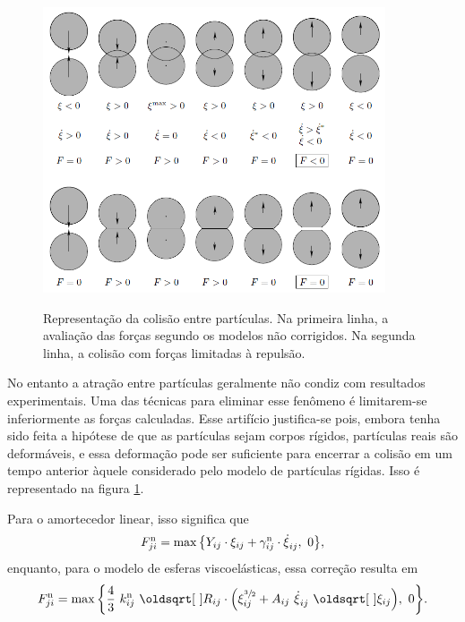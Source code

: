 \begin{figure}[h]
	\caption{Representação da colisão entre partículas. Na primeira linha, a avaliação das forças segundo os modelos não corrigidos. Na segunda linha, a colisão com forças limitadas à repulsão.}
	\centering
		\includegraphics[width=0.9\textwidth]{images/mathematical_model/particle_attraction.PNG}
	\label{fig:particle_attraction}
\end{figure}

No entanto a atração entre partículas geralmente não condiz com resultados experimentais. Uma das técnicas para eliminar esse fenômeno é limitarem-se inferiormente as forças calculadas. Esse artifício justifica-se pois, embora tenha sido feita a hipótese de que as partículas sejam corpos rígidos, partículas reais são deformáveis, e essa deformação pode ser suficiente para encerrar a colisão em um tempo anterior àquele considerado pelo modelo de partículas rígidas. Isso é representado na figura \ref{fig:particle_attraction}.

Para o amortecedor linear, isso significa que
\begin{equation*}
	\normalForceScalarji = \max\Bqty{\elasticModulusij\cdot\overlapij + \normalDampingConstantij\cdot\overlapDerivativeij, \,\, 0},
\end{equation*}
enquanto, para o modelo de esferas viscoelásticas, essa correção resulta em
\begin{equation*}
	\normalForceScalarji = \max\Bqty{\dfrac{4}{3}\ \effectiveNormalElasticij\ \sqrt{\effectiveRadiusij}\cdot\pqty{
		\overlapij^{\sfrac{3}{2}} + \normalDissipativeConstantij\ \overlapDerivativeij\ \sqrt{\overlapij}
	}, \,\, 0}.
\end{equation*}

